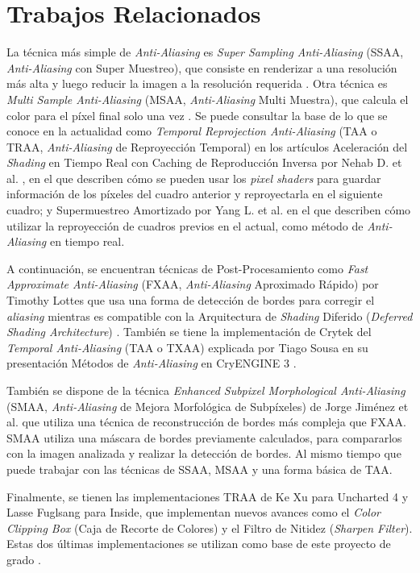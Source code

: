 \documentclass[pregrado]{tesis-usb} %
\begin{document}
\section{Trabajos Relacionados}
La técnica más simple de \textit{Anti-Aliasing} es \textit{Super Sampling Anti-Aliasing} (SSAA, \textit{Anti-Aliasing} con Super Muestreo), que consiste en renderizar a una resolución más alta y luego reducir la imagen a la resolución requerida \cite{Doggett2017EDAN35}. Otra técnica es \textit{Multi Sample Anti-Aliasing} (MSAA, \textit{Anti-Aliasing} Multi Muestra), que calcula el color para el píxel final solo una vez \cite{Doggett2017EDAN35}. Se puede consultar la base de lo que se conoce en la actualidad como \textit{Temporal Reprojection Anti-Aliasing} (TAA o TRAA, \textit{Anti-Aliasing} de Reproyección Temporal) en los artículos Aceleración del \textit{Shading} en Tiempo Real con Caching de Reproducción Inversa por Nehab D. et al.  \cite{Nehab2007}, en el que describen cómo se pueden usar los \textit{pixel shaders} para guardar información de los píxeles del cuadro anterior y reproyectarla en el siguiente cuadro; y Supermuestreo Amortizado por Yang L. et al.  \cite{Yang2009} en el que describen cómo utilizar la reproyección de cuadros previos  en el actual, como método de \textit{Anti-Aliasing} en tiempo real.

A continuación, se encuentran técnicas de Post-Procesamiento como \textit{Fast Approximate Anti-Aliasing} (FXAA, \textit{Anti-Aliasing} Aproximado Rápido) por Timothy Lottes \cite{Lottes2009} que usa una forma de detección de bordes para corregir el \textit{aliasing} mientras es compatible con la Arquitectura de \textit{Shading} Diferido (\textit{Deferred Shading Architecture}) \cite{Doggett2017EDAN35}. También se tiene la implementación de Crytek del \textit{Temporal Anti-Aliasing} (TAA o TXAA) explicada por Tiago Sousa en su presentación Métodos de \textit{Anti-Aliasing} en CryENGINE 3 \cite{JIMENEZ2011_SIGGRAPH11}.

También se dispone de la técnica \textit{Enhanced Subpixel Morphological Anti-Aliasing} (SMAA, \textit{Anti-Aliasing} de Mejora Morfológica de Subpíxeles) de Jorge Jiménez et al. \cite{Jimenez2012} que utiliza una técnica de reconstrucción de bordes más compleja que FXAA. SMAA utiliza una máscara de bordes previamente calculados, para compararlos con la imagen analizada y realizar la detección de bordes. Al mismo tiempo que puede trabajar con las técnicas de SSAA, MSAA y una forma básica de TAA.

Finalmente, se tienen las implementaciones TRAA de Ke Xu para Uncharted 4 y Lasse Fuglsang para Inside, que implementan nuevos avances como el \textit{Color Clipping Box} (Caja de Recorte de Colores) y el Filtro de Nitidez (\textit{Sharpen Filter}). Estas dos últimas implementaciones se utilizan como base de este proyecto de grado \cite{Fuglsand2016, XU2016}.
\end{document}
